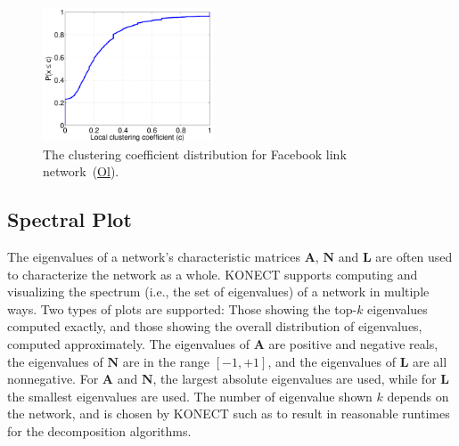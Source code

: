 \documentclass{article}
\newcommand{\wPlot}{0.45\textwidth}
\begin{document}
\begin{figure}
  \centering
  \includegraphics[width=\wPlot]{plot/cluscod.a.facebook-wosn-links}
  \caption{ The clustering coefficient distribution for Facebook link
    network~(\href{http://konect.cc/networks/facebook-wosn-links/}{\textsf{Ol}}).
  }
\end{figure}

\subsection{Spectral Plot}
The eigenvalues of a network's characteristic matrices $\mathbf A$,
$\mathbf N$ and $\mathbf L$ are often used to characterize the network
as a whole.  KONECT supports computing and visualizing the spectrum
(i.e., the set of eigenvalues) of a network in multiple ways.  Two types
of plots are supported: Those showing the top-$k$ eigenvalues computed
exactly, and those showing the overall distribution of eigenvalues,
computed approximately. The eigenvalues of $\mathbf A$ are positive and
negative reals, the eigenvalues of $\mathbf N$ are in the range
$[-1,+1]$, and the eigenvalues of $\mathbf L$ are all nonnegative.  For
$\mathbf A$ and $\mathbf N$, the largest absolute eigenvalues are used,
while for $\mathbf L$ the smallest eigenvalues are used.  The number of
eigenvalue shown $k$ depends on the network, and is chosen by KONECT
such as to result in reasonable runtimes for the decomposition
algorithms.
\end{document}
